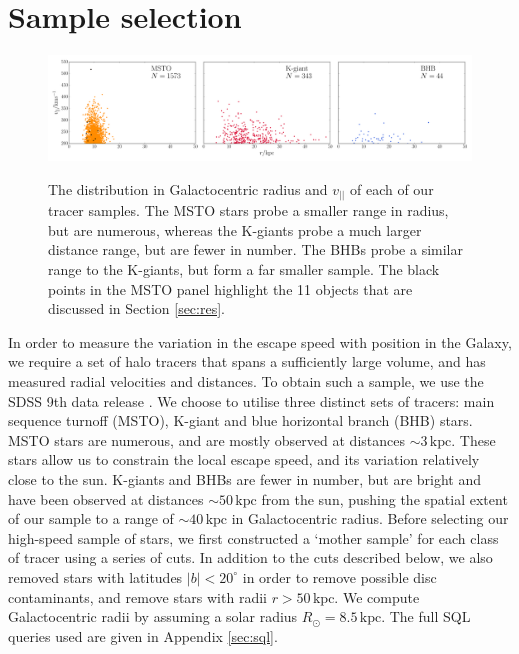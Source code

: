 \documentclass[useAMS,twocolumn,usenatbib]{mn2e}
\def\kpc{{\,\mathrm{kpc}}}
\def\vlos{{v_{||}}}
\begin{document}
\section{Sample selection}

\label{sec:samples}

\begin{figure}
\includegraphics[width=2\columnwidth]{plots/tracer_distributions}\\
\caption{The distribution in Galactocentric radius and $\vlos$ of each of our tracer samples. 
The MSTO stars probe a smaller range in radius, but are numerous, whereas the K-giants probe a much larger distance range, but are fewer in number.
The BHBs probe a similar range to the K-giants, but form a far smaller sample.
The black points in the MSTO panel highlight the 11 objects that are discussed in Section \ref{sec:res}.}
\label{fig:data}
\end{figure}


In order to measure the variation in the escape speed with position in the Galaxy, we require a set of halo tracers that spans a sufficiently large volume, and has measured radial velocities and distances. 
To obtain such a sample, we use the SDSS 9th data release \citep{Ah12}. 
We choose to utilise three distinct sets of tracers: main sequence turnoff (MSTO), K-giant and blue horizontal branch (BHB) stars. 
MSTO stars are numerous, and are mostly observed at distances $\sim 3\kpc$. 
These stars allow us to constrain the local escape speed, and its variation relatively close to the sun. 
K-giants and BHBs are fewer in number, but are bright and have been observed at distances $\sim 50\kpc$ from the sun, pushing the spatial extent of our sample to a range of $\sim 40\kpc$ in Galactocentric radius. 
Before selecting our high-speed sample of stars, we first constructed a `mother sample' for each class of tracer using a series of cuts. 
In addition to the cuts described below, we also removed stars with latitudes $|b| < 20^\circ$ in order to remove possible disc contaminants, and remove stars with radii $r>50\kpc$. 
We compute Galactocentric radii by assuming a solar radius $R_\odot = 8.5\kpc$. 
The full {\sc SQL} queries used are given in Appendix \ref{sec:sql}.
\end{document}
